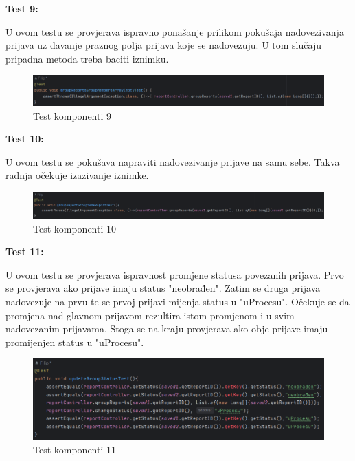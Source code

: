 			\textbf{Test 9:}
			
			U ovom testu se provjerava ispravno ponašanje prilikom pokušaja nadovezivanja prijava uz davanje praznog polja prijava koje se nadovezuju. U tom slučaju pripadna metoda treba baciti iznimku.
			
			\begin{figure}[H]
				\includegraphics[width=\textwidth]{slike/JUnitTest9.png} %
				\caption{Test komponenti 9}
				\label{fig:JUnitTest9} %
			\end{figure}
			
			\textbf{Test 10:}
			
			U ovom testu se pokušava napraviti nadovezivanje prijave na samu sebe. Takva radnja očekuje izazivanje iznimke.
			
			\begin{figure}[H]
				\includegraphics[width=\textwidth]{slike/JUnitTest10.png} %
				\caption{Test komponenti 10}
				\label{fig:JUnitTest10} %
			\end{figure}
			
			\textbf{Test 11:}
			
			U ovom testu se provjerava ispravnost promjene statusa povezanih prijava. Prvo se provjerava ako prijave imaju status "neobrađen". Zatim se druga prijava nadovezuje na prvu te se prvoj prijavi mijenja status u "uProcesu". Očekuje se da promjena nad glavnom prijavom rezultira istom promjenom i u svim nadovezanim prijavama. Stoga se na kraju provjerava ako obje prijave imaju promijenjen status u "uProcesu".
			
			\begin{figure}[H]
				\includegraphics[width=\textwidth]{slike/JUnitTest11.png} %
				\caption{Test komponenti 11}
				\label{fig:JUnitTest11} %
			\end{figure}
			
